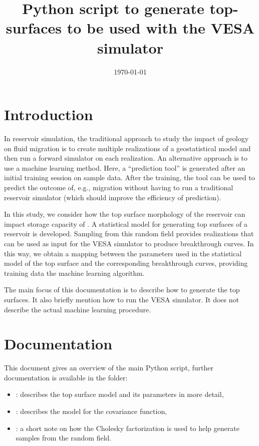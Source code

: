 \documentclass[11pt,a4paper]{amsart}
\begin{document}
\title{Python script to generate top-surfaces to be used with the VESA simulator}
\date{\today}
\maketitle
\section{Introduction}
\label{sec:introduction}
In reservoir simulation, the traditional approach to study the impact of
geology on fluid migration is 
to create multiple realizations of a geostatistical model and then run a
forward simulator on each realization. An alternative approach is to use a
machine learning method. Here, a ``prediction tool'' is generated after an initial
training session on sample data. After the training, the tool can be
used to predict the outcome of, e.g., \cotwo{} migration without having to run
a traditional reservoir simulator (which should improve the efficiency of prediction).

In this study, we consider how the top surface morphology of the
reservoir can impact storage capacity \cite{nil12:imp} of \cotwo{}.
A statistical model for generating top surfaces of a
reservoir is developed. Sampling from this random field provides 
realizations that can be used as input for the VESA simulator
\cite{gas09:ver} to produce breakthrough curves. In this way, we obtain a
mapping between the parameters used in the statistical model of the top
surface and the corresponding
breakthrough curves, providing training data the machine learning algorithm.

The main focus of this documentation is to describe how to generate the top
surfaces. It also briefly mention how to run the VESA simulator.
It does not describe the actual machine learning procedure. 

\section{Documentation}
This document \docMain{} gives an overview of the main Python script,
further documentation is available in the \docsFolder{} folder:  
\begin{itemize}
\item \docSetup {} : describes the top surface model and its parameters in
  more detail, 
\item \docVariogram{} : describes the model for the covariance function,
\item \docCholesky{} : a short note on how the Cholesky factorization is used
  to help generate samples from the random field.
\end{itemize}
\end{document}
